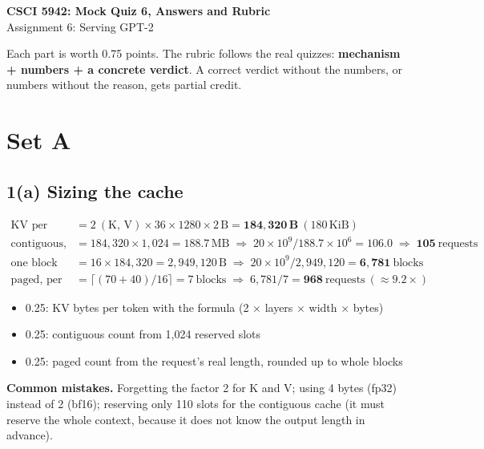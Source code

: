 \documentclass[10pt]{article}
\newenvironment{rubric}{%
  \begin{tcolorbox}[colback=black!4, colframe=black!40, boxrule=0.4pt,
                    arc=0pt, title={Rubric}, fonttitle=\bfseries\small,
                    coltitle=black, colbacktitle=black!12]
  \small\begin{itemize}[leftmargin=*, nosep]}{%
  \end{itemize}\end{tcolorbox}}
\begin{document}
\begin{center}
{\Large\bfseries CSCI 5942: Mock Quiz 6, Answers and Rubric}\\[3pt]
{\large Assignment 6: Serving GPT-2}
\end{center}

Each part is worth 0.75 points. The rubric follows the real quizzes:
\textbf{mechanism + numbers + a concrete verdict}. A correct verdict
without the numbers, or numbers without the reason, gets partial credit.

\section*{Set A}

\subsection*{1(a) Sizing the cache}

\begin{align*}
\text{KV per token} &= 2\ (\text{K, V}) \times 36 \times 1280 \times 2\,\text{B}
  = \mathbf{184{,}320\,B}\ (180\,\text{KiB}) \\
\text{contiguous, per request} &= 184{,}320 \times 1{,}024 = 188.7\,\text{MB}
  \;\Rightarrow\; 20 \times 10^9 / 188.7 \times 10^6 = 106.0
  \;\Rightarrow\; \mathbf{105}\ \text{requests} \\
\text{one block} &= 16 \times 184{,}320 = 2{,}949{,}120\,\text{B}
  \;\Rightarrow\; 20 \times 10^9 / 2{,}949{,}120 = \mathbf{6{,}781}\ \text{blocks} \\
\text{paged, per request} &= \lceil (70 + 40) / 16 \rceil = 7\ \text{blocks}
  \;\Rightarrow\; 6{,}781 / 7 = \mathbf{968}\ \text{requests}\ (\approx 9.2\times)
\end{align*}

\begin{rubric}
\item 0.25: KV bytes per token with the formula (2 $\times$ layers $\times$ width $\times$ bytes)
\item 0.25: contiguous count from 1{,}024 reserved slots
\item 0.25: paged count from the request's real length, rounded up to whole blocks
\end{rubric}

\textbf{Common mistakes.} Forgetting the factor 2 for K and V; using
4 bytes (fp32) instead of 2 (bf16); reserving only 110 slots for the
contiguous cache (it must reserve the whole context, because it does not
know the output length in advance).
\end{document}
